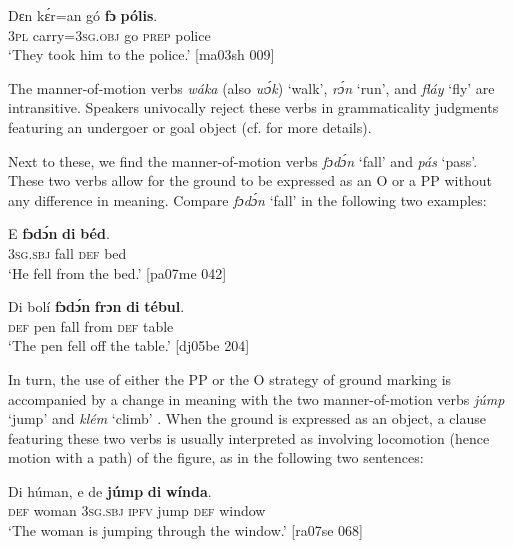 \ea%
    \label{ex:key:959}
    \gll Dɛn  kɛ́r=an    gó  \textbf{fɔ}  \textbf{pólis}.\\
\textsc{3pl}  carry=\textsc{3sg.obj}  go  \textsc{prep}  police\\

\glt ‘They took him to the police.’ [ma03sh 009]
\z

The manner-of-motion verbs \textit{wáka} (also \textit{wɔ́k}) ‘walk’, \textit{rɔ́n} ‘run’, and \textit{fláy} ‘fly’ are intransitive. Speakers univocally reject these verbs in grammaticality judgments featuring an undergoer or goal object (cf.  for more details). 


Next to these, we find the manner-of-motion verbs \textit{fɔdɔ́n} ‘fall’ and \textit{pás} ‘pass’. These two verbs allow for the ground to be expressed as an O or a PP without any difference in meaning. Compare \textit{fɔdɔ́n} ‘fall’ in the following two examples: 



\ea%
    \label{ex:key:960}
    \gll E    \textbf{fɔdɔ́n}  \textbf{di}  \textbf{béd}.\\
\textsc{3sg.sbj}  fall    \textsc{def}  bed\\

\glt ‘He fell from the bed.’ [pa07me 042]
\z


\ea%
    \label{ex:key:961}
    \gll Di  bolí  \textbf{fɔdɔ́n}  \textbf{frɔn}    \textbf{di}  \textbf{tébul}.\\
\textsc{def}  pen  fall    from  \textsc{def}  table\\

\glt ‘The pen fell off the table.’ [dj05be 204]
\z

In turn, the use of either the PP or the O strategy of ground marking is accompanied by a change in meaning with the two manner-of-motion verbs \textit{júmp} ‘jump’  and \textit{klém} ‘climb’ . When the ground is expressed as an object, a clause featuring these two verbs is usually interpreted as involving locomotion (hence motion with a path) of the figure, as in the following two sentences:


\ea%
    \label{ex:key:962}
    \gll Di  húman,  e    de  \textbf{júmp}  \textbf{di}  \textbf{wínda}.\\
\textsc{def}  woman  \textsc{3sg.sbj}  \textsc{ipfv}  jump  \textsc{def}  window\\

\glt ‘The woman is jumping through the window.’ [ra07se 068]
\z


